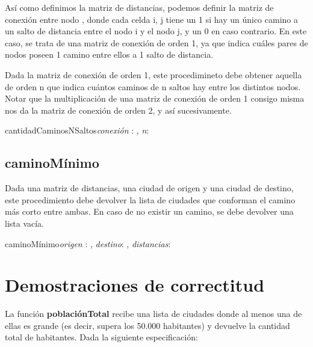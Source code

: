\documentclass[10pt,a4paper]{article}
\begin{document}
Así como definimos la matriz de distancias, podemos definir la matriz de conexión entre nodo , donde cada celda i, j tiene un 1 si hay un único camino a un salto de distancia entre el nodo i y el nodo j, y un 0 en caso contrario. En este caso, se trata de una matriz de conexión de orden 1, ya que indica cuáles pares de nodos poseen 1 camino entre ellos a 1 salto de distancia.

Dada la matriz de conexión de orden 1, este procedimineto debe obtener aquella de orden n que indica cuántos caminos de n saltos hay entre los distintos nodos. Notar que la multiplicación de una matriz de conexión de orden 1 consigo misma nos da la matriz de conexión de orden 2, y así sucesivamente.

 \vspace{2mm}
 
 \begin{proc}{cantidadCaminosNSaltos}{\Inout \textit{conexión} : \TLista{\TLista{\ent}}, \In \textit{n}: \ent}{}
	\requiere{}
	\asegura{} 
\end{proc}

\vspace{4mm}

\subsection{caminoMínimo}

 Dada una matriz de distancias, una ciudad de origen y una ciudad de destino, este procedimiento debe devolver la lista de ciudades que conforman el camino más corto entre ambas. En caso de no existir un camino, se debe devolver una lista vacía.

 \vspace{2mm}

 \begin{proc}{caminoMínimo}{\In \textit{origen} : \ent, \In \textit{destino}: \ent, \In \textit{distancias}: \TLista{\TLista{\ent}}}{\TLista{\ent}}
	\requiere{}
	\asegura{} 
\end{proc}



\vspace{8mm}



\section{Demostraciones de correctitud}

La función \textbf{poblaciónTotal} recibe una lista de ciudades donde al menos una de ellas es grande (es decir, supera los 50.000 habitantes) y devuelve la cantidad total de habitantes. Dada la siguiente especificación:
\end{document}

